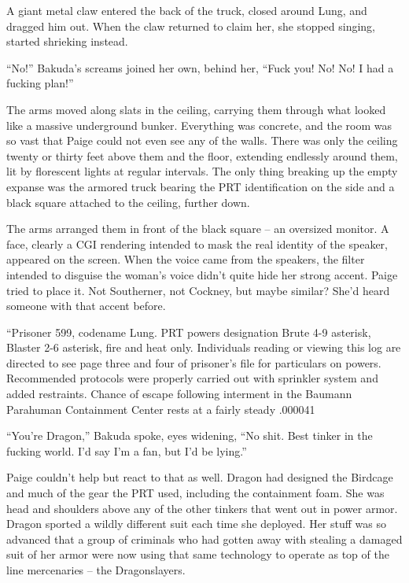 A giant metal claw entered the back of the truck, closed around Lung, and dragged him out.  When the claw returned to claim her, she stopped singing, started shrieking instead.



``No!'' Bakuda's screams joined her own, behind her, ``Fuck you!  No!  No!  I had a fucking plan!''



The arms moved along slats in the ceiling, carrying them through what looked like a massive underground bunker.  Everything was concrete, and the room was so vast that Paige could not even see any of the walls.  There was only the ceiling twenty or thirty feet above them and the floor, extending endlessly around them, lit by florescent lights at regular intervals.  The only thing breaking up the empty expanse was the armored truck bearing the PRT identification on the side and a black square attached to the ceiling, further down.



The arms arranged them in front of the black square – an oversized monitor.  A face, clearly a CGI rendering intended to mask the real identity of the speaker, appeared on the screen.  When the voice came from the speakers, the filter intended to disguise the woman's voice didn't quite hide her strong accent.  Paige tried to place it.  Not Southerner, not Cockney, but maybe similar?  She'd heard someone with that accent before.



``Prisoner 599, codename Lung.  PRT powers designation Brute 4-9 asterisk, Blaster 2-6 asterisk, fire and heat only.  Individuals reading or viewing this log are directed to see page three and four of prisoner's file for particulars on powers.  Recommended protocols were properly carried out with sprinkler system and added restraints.  Chance of escape following interment in the Baumann Parahuman Containment Center rests at a fairly steady .000041%



``You're Dragon,'' Bakuda spoke, eyes widening, ``No shit.  Best tinker in the fucking world.  I'd say I'm a fan, but I'd be lying.''



Paige couldn't help but react to that as well.  Dragon had designed the Birdcage and much of the gear the PRT used, including the containment foam.  She was head and shoulders above any of the other tinkers that went out in power armor.  Dragon sported a wildly different suit each time she deployed.  Her stuff was so advanced that a group of criminals who had gotten away with stealing a damaged suit of her armor were now using that same technology to operate as top of the line mercenaries – the Dragonslayers.




